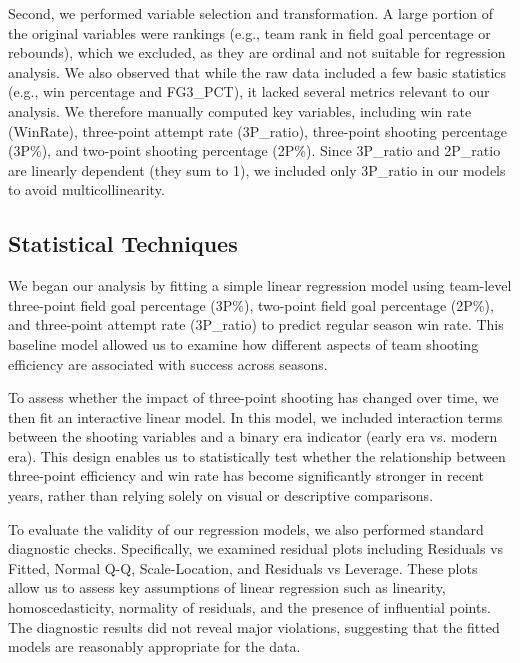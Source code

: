 \documentclass[11pt, a4paper]{article} %
\begin{document}
Second, we performed variable selection and transformation. A large portion of the original variables were rankings (e.g., team 
rank in field goal percentage or rebounds), which we excluded, as they are ordinal and not suitable for regression analysis. 
We also observed that while the raw data included a few basic statistics (e.g., win percentage and FG3\_PCT), it lacked several 
metrics relevant to our analysis. We therefore manually computed key variables, including win rate (WinRate), three-point attempt 
rate (3P\_ratio), three-point shooting percentage (3P\%), and two-point shooting percentage (2P\%). Since 3P\_ratio and 2P\_ratio 
are linearly dependent (they sum to 1), we included only 3P\_ratio in our models to avoid multicollinearity.

\subsection{Statistical Techniques}
We began our analysis by fitting a simple linear regression model using team-level three-point field goal percentage (3P\%), 
two-point field goal percentage (2P\%), and three-point attempt rate (3P\_ratio) to predict regular season win rate. This baseline 
model allowed us to examine how different aspects of team shooting efficiency are associated with success across seasons.

To assess whether the impact of three-point shooting has changed over time, we then fit an interactive linear model. In this model, 
we included interaction terms between the shooting variables and a binary era indicator (early era vs. modern era). This design 
enables us to statistically test whether the relationship between three-point efficiency and win rate has become significantly 
stronger in recent years, rather than relying solely on visual or descriptive comparisons.


To evaluate the validity of our regression models, we also performed standard diagnostic checks. Specifically, we examined 
residual plots including Residuals vs Fitted, Normal Q-Q, Scale-Location, and Residuals vs Leverage. These plots allow us to 
assess key assumptions of linear regression such as linearity, homoscedasticity, normality of residuals, and the presence of 
influential points. The diagnostic results did not reveal major violations, suggesting that the fitted models are reasonably 
appropriate for the data.
\end{document}

